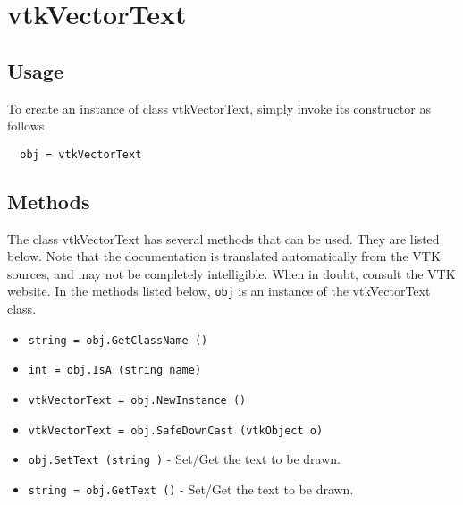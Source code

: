 \section{vtkVectorText}

\subsection{Usage}


To create an instance of class vtkVectorText, simply
invoke its constructor as follows
\begin{verbatim}
  obj = vtkVectorText
\end{verbatim}
\subsection{Methods}

The class vtkVectorText has several methods that can be used.
  They are listed below.
Note that the documentation is translated automatically from the VTK sources,
and may not be completely intelligible.  When in doubt, consult the VTK website.
In the methods listed below, \verb|obj| is an instance of the vtkVectorText class.
\begin{itemize}
\item  \verb|string = obj.GetClassName ()|

\item  \verb|int = obj.IsA (string name)|

\item  \verb|vtkVectorText = obj.NewInstance ()|

\item  \verb|vtkVectorText = obj.SafeDownCast (vtkObject o)|

\item  \verb|obj.SetText (string )| -  Set/Get the text to be drawn.

\item  \verb|string = obj.GetText ()| -  Set/Get the text to be drawn.

\end{itemize}
